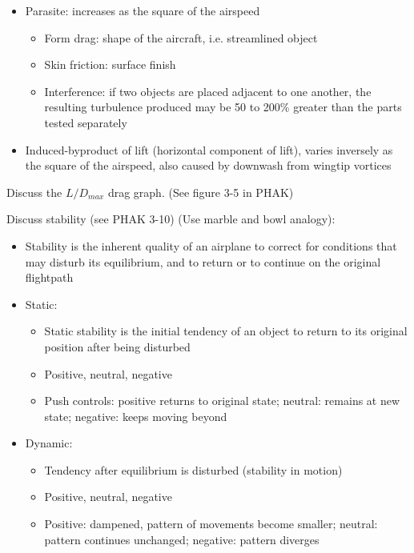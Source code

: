 \begin{itemize}
  \item Parasite: increases as the square of the airspeed
    \begin{itemize}
      \item Form drag: shape of the aircraft, i.e. streamlined object

      \item Skin friction: surface finish

      \item Interference: if two objects are placed adjacent to one another, the
        resulting turbulence produced may be 50 to 200\% greater than the parts
        tested separately
    \end{itemize}
  \item Induced-byproduct of lift (horizontal component of lift), varies
    inversely as the square of the airspeed, also caused by downwash from
    wingtip vortices
\end{itemize}

Discuss the $L/D_{max}$ drag graph. (See figure 3-5 in PHAK)

Discuss stability (see PHAK 3-10) (Use marble and bowl analogy):

\begin{itemize}
  \item Stability is the inherent quality of an airplane to correct for
    conditions that may disturb its equilibrium, and to return or to continue
    on the original flightpath
  \item Static:
    \begin{itemize}
      \item Static stability is the initial tendency of an object to return to
        its original position after being disturbed

      \item Positive, neutral, negative

      \item Push controls: positive returns to original state; neutral: remains
        at new state; negative: keeps moving beyond
    \end{itemize}
  \item Dynamic:
    \begin{itemize}
      \item Tendency after equilibrium is disturbed (stability in motion)

      \item Positive, neutral, negative

      \item Positive: dampened, pattern of movements become smaller; neutral:
        pattern continues unchanged; negative: pattern diverges
    \end{itemize}
\end{itemize}

